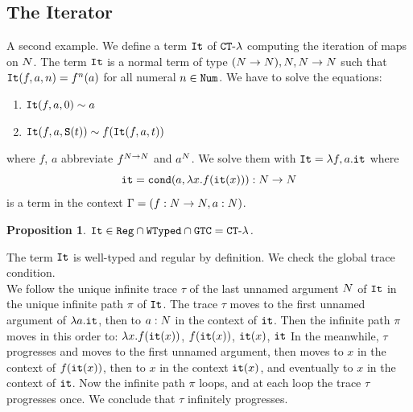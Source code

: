 \documentclass{article}
\newtheorem{proposition}[theorem]{Proposition}
\newenvironment{proof}[1][Proof]{\begin{trivlist}
\item[\hskip \labelsep {\bfseries #1}]}{\end{trivlist}}
\begin{document}

\subsection{The Iterator}
A second example. We define a term ${\tt It}$ of  ${ {\tt CT} \mbox{-} \lambda}$ computing the iteration of maps on ${N}$.
The term ${\tt It}$ is a normal term of type $({N} \rightarrow {N}), {N},{N} \rightarrow {N}$ such that
${\tt It}(f,a,n)=f^n(a)$ for all numeral $n \in {\tt Num}$. 
We have to solve the equations:

\begin{enumerate}
\item
${\tt It}(f,a,0) \sim a$ 
\item
${\tt It}(f,a,{\tt S} (t)) \sim f({\tt It}(f,a,t))$
\end{enumerate}

where $f$, $a$ abbreviate $f^{{N}\rightarrow{N}}$ and $a^{N}$.
We solve them with ${\tt It} = \lambda f, a.{\tt it}$
where 
$$
{\tt it} = {\tt cond} (a, \lambda x.f({\tt it}(x))):{N} \rightarrow {N}
$$ 
is a term in the context $\Gamma = (f:{N} \rightarrow {N}, a:{N})$.


\begin{proposition}
${\tt It} \in {\tt Reg} \cap {\tt WTyped} \cap {\tt GTC} = { {\tt CT} \mbox{-} \lambda}$.
\end{proposition}

\begin{proof}
The term ${\tt It}$ is well-typed and regular by definition. 
We check the global trace condition. 
\\
We follow the unique infinite trace $\tau$ of the last unnamed argument ${N}$ of ${\tt It}$ 
in the unique infinite path $\pi$ of ${\tt It}$. 
The trace $\tau$ moves to the first unnamed argument of $\lambda a.{\tt it}$, 
then to $a:{N}$ in the context of ${\tt it}$.
Then the infinite path $\pi$ moves in this order to:
 $\lambda x.f({\tt it}(x))$, $f({\tt it}(x))$, $ {\tt it}(x)$, ${\tt it}$
In the meanwhile, $\tau$ progresses and moves to the first unnamed argument, 
then moves to $x$ in the context of $f({\tt it}(x))$,
then to $x$ in the context ${\tt it}(x)$, and eventually to $x$ in the context of ${\tt it}$.
Now the infinite path $\pi$ loops, and at each loop the trace $\tau$ 
progresses once. We conclude that $\tau$ infinitely progresses.
\end{proof}
\end{document}
